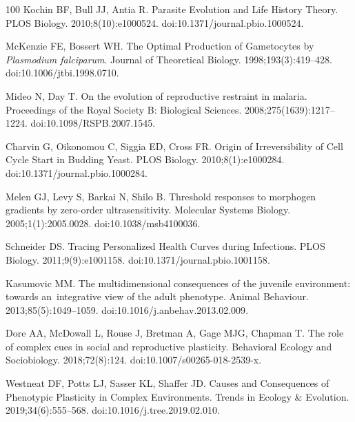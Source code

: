 \documentclass[10pt,letterpaper]{article}
\begin{document}
\begin{thebibliography}{100}
Kochin BF, Bull JJ, Antia R.
\newblock Parasite {Evolution} and {Life} {History} {Theory}.
\newblock PLOS Biology. 2010;8(10):e1000524.
\newblock doi:{10.1371/journal.pbio.1000524}.

McKenzie FE, Bossert WH.
\newblock The {Optimal} {Production} of {Gametocytes} by \textit{{Plasmodium} falciparum}.
\newblock Journal of Theoretical Biology. 1998;193(3):419--428.
\newblock doi:{10.1006/jtbi.1998.0710}.

Mideo N, Day T.
\newblock On the evolution of reproductive restraint in malaria.
\newblock Proceedings of the Royal Society B: Biological Sciences. 2008;275(1639):1217--1224.
\newblock doi:{10.1098/RSPB.2007.1545}.

Charvin G, Oikonomou C, Siggia ED, Cross FR.
\newblock Origin of {Irreversibility} of {Cell} {Cycle} {Start} in {Budding} {Yeast}.
\newblock PLOS Biology. 2010;8(1):e1000284.
\newblock doi:{10.1371/journal.pbio.1000284}.

Melen GJ, Levy S, Barkai N, Shilo B.
\newblock Threshold responses to morphogen gradients by zero-order ultrasensitivity.
\newblock Molecular Systems Biology. 2005;1(1):2005.0028.
\newblock doi:{10.1038/msb4100036}.

Schneider DS.
\newblock Tracing {Personalized} {Health} {Curves} during {Infections}.
\newblock PLOS Biology. 2011;9(9):e1001158.
\newblock doi:{10.1371/journal.pbio.1001158}.

Kasumovic MM.
\newblock The multidimensional consequences of the juvenile environment: towards an integrative view of the adult phenotype.
\newblock Animal Behaviour. 2013;85(5):1049--1059.
\newblock doi:{10.1016/j.anbehav.2013.02.009}.

Dore AA, McDowall L, Rouse J, Bretman A, Gage MJG, Chapman T.
\newblock The role of complex cues in social and reproductive plasticity.
\newblock Behavioral Ecology and Sociobiology. 2018;72(8):124.
\newblock doi:{10.1007/s00265-018-2539-x}.

Westneat DF, Potts LJ, Sasser KL, Shaffer JD.
\newblock Causes and {Consequences} of {Phenotypic} {Plasticity} in {Complex} {Environments}.
\newblock Trends in Ecology \& Evolution. 2019;34(6):555--568.
\newblock doi:{10.1016/j.tree.2019.02.010}.


\end{thebibliography}
\end{document}
